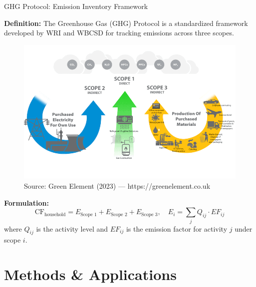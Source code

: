 \documentclass{beamer}
\begin{document}
\begin{frame}{GHG Protocol: Emission Inventory Framework}
\small
\vspace{-2.5em}

\footnotesize \textbf{Definition:}  
The Greenhouse Gas (GHG) Protocol is a standardized framework developed by WRI and WBCSD for tracking emissions across three scopes.
\vspace{-0.5em}
\begin{figure}[h]
  \centering
  \includegraphics[width=0.55\linewidth]{ghg scope.png}
  \caption*{\tiny Source: Green Element (2023) — https://greenelement.co.uk}
\end{figure}
\vspace{-1.0em}
\footnotesize \textbf{Formulation:}
\[
\text{CF}_{\text{household}} = E_{\text{Scope 1}} + E_{\text{Scope 2}} + E_{\text{Scope 3}}, \quad 
E_i = \sum_j Q_{ij} \cdot EF_{ij}
\]
{\footnotesize where $Q_{ij}$ is the activity level and $EF_{ij}$ is the emission factor for activity $j$ under scope $i$.}

\end{frame}

\section{Methods \& Applications}
\end{document}
